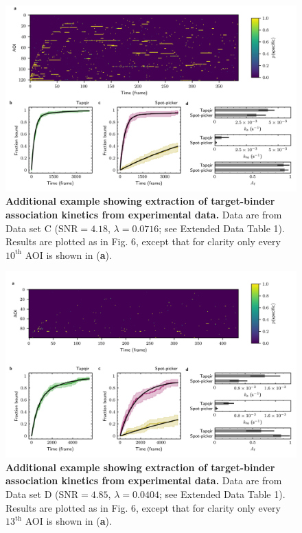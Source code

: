 \begin{figure}[t]
\centering
\includegraphics[width=\textwidth]{extended-data/figure7.png}
\caption{\textbf{Additional example showing extraction of target-binder association kinetics from experimental data.} Data are from Data set C ($\textrm{SNR} = 4.18$, $\lambda = 0.0716$; see Extended Data Table 1).  Results are plotted as in Fig. 6, except that for clarity only every $10^\mathrm{th}$ AOI is shown in (\textbf{a}).}
\label{fig:sigma54_298P2993}
\end{figure}
\clearpage
\pagebreak


\begin{figure}[t]
\centering
\includegraphics[width=\textwidth]{extended-data/figure8.png}
\caption{\textbf{Additional example showing extraction of target-binder association kinetics from experimental data.} Data are from Data set D ($\textrm{SNR} = 4.85$, $\lambda = 0.0404$; see Extended Data Table 1).  Results are plotted as in Fig. 6, except that for clarity only every $13^\mathrm{th}$ AOI is shown in (\textbf{a}).}
\label{fig:greb}
\end{figure}
\clearpage
\pagebreak

